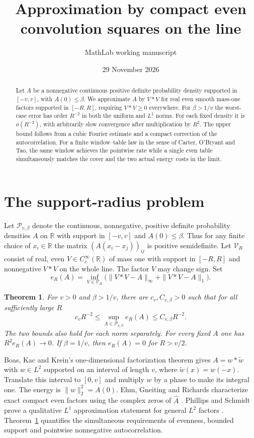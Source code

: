 \documentclass[11pt]{article}
\title{Approximation by compact even convolution squares on the line}
\author{MathLab working manuscript}
\date{29 November 2026}
\newtheorem{theorem}{Theorem}
\newcommand{\R}{\mathbb R}
\newcommand{\cV}{\mathcal V}
\newcommand{\cP}{\mathcal P}
\begin{document}
\maketitle
\begin{abstract}
Let \(A\) be a nonnegative continuous positive definite probability density supported in \([-v,v]\), with \(A(0)\le\beta\). We approximate \(A\) by \(V*V\) for real even smooth mass-one factors supported in \([-R,R]\), requiring \(V*V\ge0\) everywhere. For \(\beta>1/v\) the worst-case error has order \(R^{-2}\) in both the uniform and \(L^1\) norms. For each fixed density it is \(o(R^{-2})\), with arbitrarily slow convergence after multiplication by \(R^2\). The upper bound follows from a cubic Fourier estimate and a compact correction of the autocorrelation. For a finite window--table law in the sense of Carter, O'Bryant and Tao, the same window achieves the pointwise rate while a single even table simultaneously matches the cover and the two actual energy costs in the limit.
\end{abstract}

\section{The support-radius problem}
Let \(\cP_{v,\beta}\) denote the continuous, nonnegative, positive definite probability densities \(A\) on \(\R\) with support in \([-v,v]\) and \(A(0)\le\beta\). Thus for any finite choice of \(x_i\in\R\) the matrix \((A(x_i-x_j))_{ij}\) is positive semidefinite. Let \(\cV_R\) consist of real, even \(V\in C_c^\infty(\R)\) of mass one with support in \([-R,R]\) and nonnegative \(V*V\) on the whole line. The factor \(V\) may change sign. Set
\[
 e_R(A)=\inf_{V\in\cV_R}\big(\|V*V-A\|_\infty+\|V*V-A\|_1\big).
\]

\begin{theorem}\label{th:rate}
For \(v>0\) and \(\beta>1/v\), there are \(c_v,C_{v,\beta}>0\) such that for all sufficiently large \(R\)
\[
 c_v R^{-2}\le \sup_{A\in\cP_{v,\beta}} e_R(A)\le C_{v,\beta}R^{-2}.
\]
The two bounds also hold for each norm separately. For every fixed \(A\) one has \(R^2e_R(A)\to0\). If \(\beta=1/v\), then \(e_R(A)=0\) for \(R>v/2\).
\end{theorem}

Boas, Kac and Krein's one-dimensional factorization theorem gives \(A=w*\widetilde w\) with \(w\in L^2\) supported on an interval of length \(v\), where \(\widetilde w(x)=\overline{w(-x)}\). Translate this interval to \([0,v]\) and multiply \(w\) by a phase to make its integral one. The energy is \(\|w\|_2^2=A(0)\). Ehm, Gneiting and Richards characterize exact compact even factors using the complex zeros of \(\widehat A\) \cite[Theorem 2.1]{egr}. Phillips and Schmidt prove a qualitative \(L^1\) approximation statement for general \(L^2\) factors \cite[Corollary 5]{ps}. Theorem~\ref{th:rate} quantifies the simultaneous requirements of evenness, bounded support and pointwise nonnegative autocorrelation.
\end{document}
